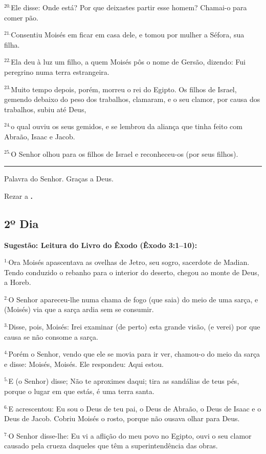 \documentclass[a4paper,14pt]{extarticle} \usepackage[utf8]{inputenc}
\begin{document}
$^{20. }$Ele disse: Onde está? Por que deixastes partir esse homem? Chamai-o para comer pão.

$^{21. }$Consentiu Moisés em ficar em casa dele, e tomou por mulher a Séfora, sua filha.

$^{22. }$Ela deu à luz um filho, a quem Moisés pôs o nome de Gersão, dizendo: Fui peregrino numa terra estrangeira.

$^{23. }$Muito tempo depois, porém, morreu o rei do Egipto. Os filhos de Israel, gemendo debaixo do peso dos trabalhos, clamaram, e o seu clamor, por causa dos trabalhos, subiu até Deus,

$^{24. }$o qual ouviu os seus gemidos, e se lembrou da aliança que tinha feito com Abraão, Isaac e Jacob.

$^{25. }$O Senhor olhou para os filhos de Israel e reconheceu-os (por seus filhos).

\par\noindent\rule{\textwidth}{0.4pt}

Palavra do Senhor. Graças a Deus.

Rezar a \textbf{.}
\subsection{2º Dia}
\textbf{Sugestão: Leitura do Livro do Êxodo (Êxodo 3:1–10):}

$^{1.}$Ora Moisés apascentava as ovelhas de Jetro, seu sogro, sacerdote de Madian. Tendo conduzido o rebanho para o interior do deserto, chegou ao monte de Deus, a Horeb.

$^{2.}$O Senhor apareceu-lhe numa chama de fogo (que saia) do meio de uma sarça, e (Moisés) via que a sarça ardia sem se consumir.

$^{3.}$Disse, pois, Moisés: Irei examinar (de perto) esta grande visão, (e verei) por que causa se não consome a sarça.

$^{4.}$Porém o Senhor, vendo que ele se movia para ir ver, chamou-o do meio da sarça e disse: Moisés, Moisés. Ele respondeu: Aqui estou.

$^{5.}$E (o Senhor) disse; Não te aproximes daqui; tira as sandálias de teus pés, porque o lugar em que estás, é uma terra santa.

$^{6.}$E acrescentou: Eu sou o Deus de teu pai, o Deus de Abraão, o Deus de Isaac e o Deus de Jacob. Cobriu Moisés o rosto, porque não ousava olhar para Deus.

$^{7.}$O Senhor disse-lhe: Eu vi a aflição do meu povo no Egipto, ouvi o seu clamor causado pela crueza daqueles que têm a superintendência das obras.
\end{document}
